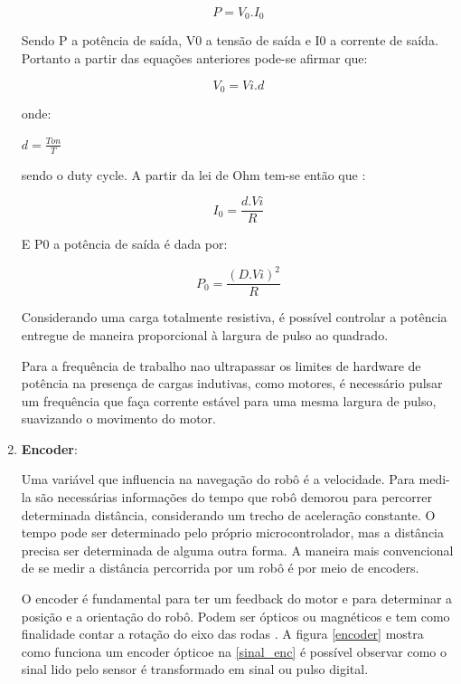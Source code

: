 \begin{enumerate}
					\begin{equation}
					P = V_{0} . I_{0}
					\end{equation}

					Sendo P a potência de saída, V0 a tensão de saída e I0 a corrente de saída. Portanto a partir das equações anteriores pode-se afirmar que:

					\begin{equation}
					V_{0} = Vi . d
					\end{equation}

					onde:

					$d = \frac{Ton}{T}$

					sendo  o duty cycle. A partir da lei de Ohm tem-se então que :

					\begin{equation}
					I_{0} = \frac{d . Vi}{R}
					\end{equation}

					E P0 a potência de saída é dada por:

					\begin{equation}
					P_{0} = \frac{(D . Vi)^{2}}{R}
					\end{equation}

					Considerando uma carga totalmente resistiva, é possível controlar a potência entregue de maneira proporcional à largura de pulso ao quadrado.

					Para a frequência de trabalho nao ultrapassar os limites de hardware de potência na presença de cargas indutivas, como motores, é necessário pulsar um frequência que faça corrente estável para uma mesma largura de pulso, suavizando o movimento do motor.

			  \item \textbf{Encoder}:

          Uma variável que influencia na navegação do robô é a velocidade. Para medi-la são necessárias informações do tempo que robô demorou para percorrer determinada distância, considerando um trecho de aceleração constante. O tempo pode ser determinado pelo próprio microcontrolador, mas a distância precisa ser determinada de alguma outra forma. A maneira mais convencional de se medir a distância percorrida por um robô é por meio de encoders.

          O encoder é fundamental para ter um feedback do motor e para determinar a posição e a orientação do robô. Podem ser ópticos ou magnéticos e tem como finalidade contar a rotação do eixo das rodas \cite{embedded}. A figura \ref{encoder} mostra como funciona um encoder ópticoe na \ref{sinal_enc} é possível observar como o sinal lido pelo sensor é transformado em sinal ou pulso digital.


\end{enumerate}
